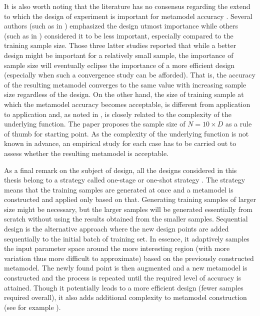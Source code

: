 It is also worth noting that the literature has no consensus regarding the extend to which the design of experiment is important for metamodel accuracy \cite{Viana2016}.
Several authors (such as in \cite{Koehler1996,Jin2003,Damblin2013}) emphasized the design utmost importance while others (such as in \cite{Simpson2001a,Liu2005,Chen2016}) considered it to be less important, especially compared to the training sample size. 
Those three latter studies reported that while a better design might be important for a relatively small sample, the importance of sample size will eventually eclipse the importance of a more efficient design (especially when such a convergence study can be afforded).
That is, the accuracy of the resulting metamodel converges to the same value with increasing sample size regardless of the design.
On the other hand, the size of training sample at which the metamodel accuracy becomes acceptable, is different from application to application and, as noted in \cite{Loeppky2009}, is closely related to the complexity of the underlying function.
The paper proposes the sample size of $N = 10\times D$ as a rule of thumb for starting point.
As the complexity of the underlying function is not known in advance, an empirical study for each case has to be carried out to assess whether the resulting metamodel is acceptable.    

As a final remark on the subject of design,
all the designs considered in this thesis belong to a strategy called one-stage or one-shot strategy \cite{Kleijnen2007,Crombecq2011}.
The strategy means that the training samples are generated at once and a metamodel is constructed and applied only based on that.
Generating training samples of larger size might be necessary, but the larger samples will be generated essentially from scratch without using the results obtained from the smaller samples. 
Sequential design is the alternative approach where the new design points are added sequentially to the initial batch of training set.
In essence, it adaptively samples the input parameter space around the more interesting region (with more variation thus more difficult to approximate) based on the previously constructed metamodel.
The newly found point is then augmented and a new metamodel is constructed and the process is repeated until the required level of accuracy is attained.
Though it potentially leads to a more efficient design (fewer samples required overall), it also adds additional complexity to metamodel construction (see for example \cite{Xiong2009,Crombecq2011}). 

